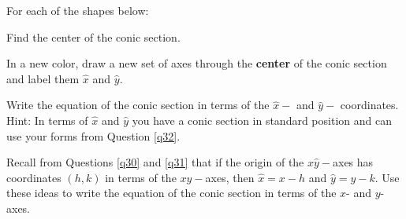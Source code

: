 \bq For each of the shapes below:
\be
\item Find the center of the conic section.
\item In a new color, draw a new set of axes through the \textbf{center} of the conic section and label them $\hat{x}$ and $\hat{y}$.
\item Write the equation of the conic section in terms of the $\hat{x}-$ and $\hat{y}-$ coordinates. Hint: In terms of $\hat{x}$ and $\hat{y}$ you have a conic section in standard position and can use your forms from Question \ref{q32}.
\item Recall from Questions \ref{q30} and \ref{q31} that if the origin of the $\hat{x}\hat{y}-$axes has coordinates  $(h,k)$ in terms of the $xy-$axes, then $\hat{x} =x-h$ and $\hat{y}=y-k$. Use these ideas to write the equation of the conic section in terms of the $x$- and $y$-axes.
\ee
